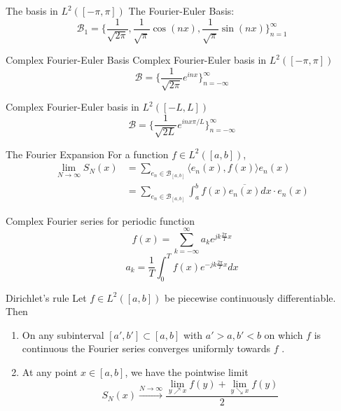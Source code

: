 \documentclass{beamer}
\begin{document}
\begin{frame}

\begin{block}{The basis in $L^2([-\pi,\pi])$}
The Fourier-Euler Basis:
$$\mathcal{B}_1=\Big\lbrace \dfrac{1}{\sqrt{2\pi}},\dfrac{1}{\sqrt{\pi}}\cos(nx),\dfrac{1}{\sqrt{\pi}}\sin(nx)\Big\rbrace_{n=1}^{\infty}$$

\begin{block}{Complex Fourier-Euler Basis}
Complex Fourier-Euler basis in $L^2([-\pi,\pi])$
$$\mathcal{B}=\Big\lbrace \dfrac{1}{\sqrt{2\pi}}e^{inx}\Big\rbrace_{n=-\infty}^{\infty}$$
\end{block}
Complex Fourier-Euler basis in $L^2([-L,L])$
$$\mathcal{B}=\Big\lbrace \dfrac{1}{\sqrt{2L}}e^{inx\pi/L}\Big\rbrace_{n=-\infty}^{\infty}$$
\end{block}
\end{frame}
\begin{frame}
\begin{block}{The Fourier Expansion}
For a function $f\in L^2([a,b])$, 
\begin{align*}
\lim\limits_{N\rightarrow\infty}S_N(x)&=\sum\limits_{e_n\in\mathcal{B}_{[a,b]}}\langle e_n(x),f(x) \rangle e_n(x)\\
&=\sum\limits_{e_n\in\mathcal{B}_{[a,b]}}\int_{a}^{b} f(x)\overline{e_n(x)} dx\cdot e_n(x)
\end{align*}
\end{block}
\end{frame}
\begin{frame}
\begin{block}{Complex Fourier series for periodic function}
$$f(x)=\sum\limits_{k=-\infty}^{\infty}a_ke^{jk\frac{2\pi}{T}x}$$
$$a_k=\dfrac{1}{T}\int_{0}^{T}f(x)e^{-jk\frac{2\pi}{T}x}dx$$
\end{block}
\end{frame}




\begin{frame}
\begin{block}{Dirichlet's rule}
Let $f \in L^2([a, b])$ be piecewise continuously differentiable. Then
\begin{enumerate}
\item On any subinterval $[a', b'] \subset [a, b]$ with $a' > a, b' < b$ on which $f$ is continuous the Fourier series converges uniformly towards $f$ .
\item At any point $x \in [a, b]$, we have the pointwise limit
$$S_N(x)\xrightarrow{N\rightarrow\infty}\dfrac{\lim\limits_{y\nearrow x}f(y)+\lim\limits_{y\searrow x}f(y)}{2}$$
\end{enumerate}
\end{block}
\end{frame}
\end{document}

